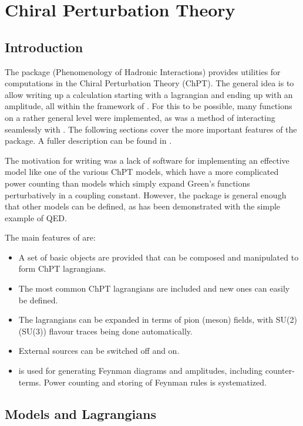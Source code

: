 \section{Chiral Perturbation Theory}

\subsection{Introduction}

The package \fphi (Phenomenology of Hadronic Interactions) provides utilities for computations in
the Chiral Perturbation Theory (ChPT).
The general idea is to allow writing up a calculation starting with a lagrangian and ending up
with an amplitude, all within the framework of \fc. For this to be possible, many functions on a
rather general level were implemented, as was a method of interacting seamlessly with \fa. The
following sections cover the more important features of the package. A fuller description can be
found in \cite{PHI}.

The motivation for writing \fphi was a lack of software for implementing an effective model like 
one of the various ChPT models, which have a more complicated power counting than models which 
simply expand Green's functions perturbatively in a coupling constant. However, the package is 
general enough that other models can be defined, as has been demonstrated with the simple example 
of QED.

The main features of \fphi are:
\begin{itemize}
\item A set of basic objects are provided that can be composed and manipulated to form ChPT
lagrangians.
\item The most common ChPT lagrangians are included and new ones can easily be defined.
\item The lagrangians can be expanded in terms of pion (meson) fields, with SU(2) (SU(3)) flavour
traces being done automatically.
\item External sources can be switched off and on.
\item \fa is used for generating Feynman diagrams and amplitudes, including counter-terms. Power
counting and storing of Feynman rules is systematized.
\end{itemize}

\subsection{Models and Lagrangians}

